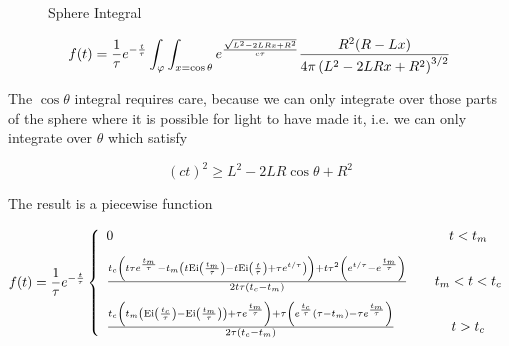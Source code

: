 \documentclass{article}
\begin{document}
\begin{figure}
    \centering
    \caption{Sphere Integral}
    \label{sphere_integral}
\end{figure}

\begin{equation}
    f(t) = \frac{1}{\tau} e^{-\frac{t}{\tau}} \int_{\varphi} \int_{x = \cos{\theta}} e^{\frac{\sqrt{L^2-2 L R x+R^2}}{c
    \tau }} \frac{R^2 (R-L x)}{4\pi
    \left(L^2-2 L R x+R^2\right)^{3/2}} \\[2ex]
\end{equation}

The $\cos{\theta}$ integral requires care, because we can only integrate over
those parts of the sphere where it is possible for light to have made it, i.e.
we can only integrate over $\theta$ which satisfy

\[
    (c t)^2 \geq L^2-2 L R \cos{\theta} +R^2
\]

\newpage
The result is a piecewise function

\begin{equation}
    f(t) = \frac{1}{\tau} e^{-\frac{t}{\tau}}\left\{
    \begin{array}{l c}
        0 & \quad t < t_m \\[2ex]

        \frac{t_c \left(t \tau  e^{\frac{t_m}{\tau }}-t_m \left(t
        \text{Ei}\left(\frac{t_m}{\tau }\right)-t
        \text{Ei}\left(\frac{t}{\tau}\right)+\tau  e^{t/\tau }\right)\right)+t \tau ^2
        \left(e^{t/\tau }-e^{\frac{t_m}{\tau }}\right)}{2 t \tau\left(t_c-t_m\right)}
        & \quad
        t_m < t < t_c \\[2ex]

        \frac{t_c \left(t_m \left(\text{Ei}\left(\frac{t_c}{\tau
        }\right)-\text{Ei}\left(\frac{t_m}{\tau }\right)\right)+\tau e^{\frac{t_m}{\tau
        }}\right)+\tau  \left(e^{\frac{t_c}{\tau }} \left(\tau -t_m\right)-\tau
        e^{\frac{t_m}{\tau }}\right)}{2\tau  \left(t_c-t_m\right)}
        & \quad
        t > t_c
    \end{array} \right. \\[2ex]
    \label{f_t}
\end{equation}
\end{document}
